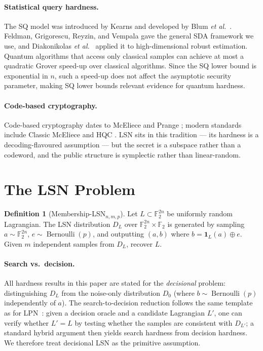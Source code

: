 \documentclass[11pt,a4paper]{article}
\theoremstyle{plain}
\theoremstyle{definition}
\newtheorem{definition}[theorem]{Definition}
\newcommand{\F}{\mathbb{F}}
\newcommand{\etal}{\textit{et al.}}
\begin{document}
\paragraph{Statistical query hardness.}
The SQ model was introduced by Kearns \cite{Kea98} and developed by Blum \etal\ \cite{BFJ+94}. Feldman, Grigorescu, Reyzin, and Vempala \cite{FGR+17} gave the general SDA framework we use, and Diakonikolas \etal\ \cite{DKS17} applied it to high-dimensional robust estimation. Quantum algorithms that access only classical samples can achieve at most a quadratic Grover speed-up over classical algorithms. Since the SQ lower bound is exponential in $n$, such a speed-up does not affect the asymptotic security parameter, making SQ lower bounds relevant evidence for quantum hardness.

\paragraph{Code-based cryptography.}
Code-based cryptography dates to McEliece \cite{McE78} and Prange \cite{Pra62}; modern standards include Classic McEliece \cite{ABD+21} and HQC \cite{AAC+22}. LSN sits in this tradition --- its hardness is a decoding-flavoured assumption --- but the secret is a subspace rather than a codeword, and the public structure is symplectic rather than linear-random.

\section{The LSN Problem}
\label{sec:lsn-problem}

\begin{definition}[Membership-LSN$_{n,m,p}$]
\label{def:lsn}
Let $L \subset \F_2^{2n}$ be uniformly random Lagrangian. The LSN distribution $D_L$ over $\F_2^{2n} \times \F_2$ is generated by sampling $a \sim \F_2^{2n}$, $e \sim \operatorname{Bernoulli}(p)$, and outputting $(a, b)$ where $b = \mathbf{1}_L(a) \oplus e$. Given $m$ independent samples from $D_L$, recover $L$.
\end{definition}

\paragraph{Search vs.~decision.} All hardness results in this paper are stated for the \emph{decisional} problem: distinguishing $D_L$ from the noise-only distribution $D_0$ (where $b \sim \operatorname{Bernoulli}(p)$ independently of $a$). The search-to-decision reduction follows the same template as for LPN~\cite{BFKL94}: given a decision oracle and a candidate Lagrangian $L'$, one can verify whether $L'=L$ by testing whether the samples are consistent with $D_{L'}$; a standard hybrid argument then yields search hardness from decision hardness. We therefore treat decisional LSN as the primitive assumption.
\end{document}
